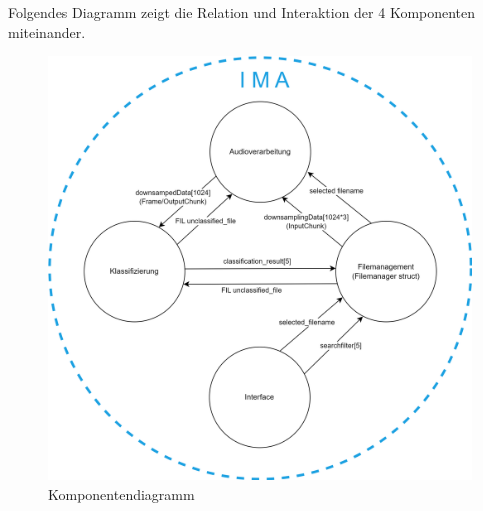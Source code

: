 \begin{itemize}
    Folgendes Diagramm zeigt die Relation und Interaktion der 4 Komponenten miteinander.
    
    \begin{figure}[H]
    	\centering
    	\includegraphics[width=1.0\textwidth]{images/04_spezifikation/komponentendiagramm.drawio.png}
    	\caption{Komponentendiagramm}
    	\label{fig:komponentendiagramm}
    \end{figure}
\end{itemize}